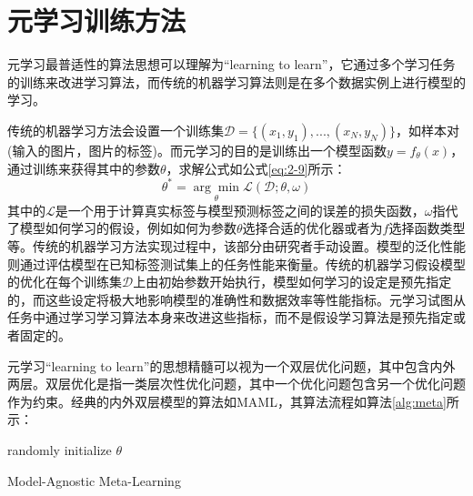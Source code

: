 \section{元学习训练方法}
元学习最普适性的算法思想可以理解为“learning to learn”，它通过多个学习任务的训练来改进学习算法，而传统的机器学习算法则是在多个数据实例上进行模型的学习。

传统的机器学习方法会设置一个训练集\(\mathcal{D} = \{(x_{1},y_{1}),...,(x_{N},y_{N})\}\)，如样本对(输入的图片，图片的标签)。而元学习的目的是训练出一个模型函数\(y = f_{\theta}(x)\)，通过训练来获得其中的参数\(\theta\)，求解公式如公式\ref{eq:2-9}所示：
\begin{equation}
  \theta^{*} = \underset { \theta } { \operatorname { arg } \operatorname { min } }\mathcal{L}(\mathcal{D};\theta,\omega) \label{eq:2-9}
\end{equation}
其中的\(\mathcal{L}\)是一个用于计算真实标签与模型预测标签之间的误差的损失函数，\(\omega\)指代了模型如何学习的假设，例如如何为参数\(\theta\)选择合适的优化器或者为\(f\)选择函数类型等。传统的机器学习方法实现过程中，该部分由研究者手动设置。模型的泛化性能则通过评估模型在已知标签测试集上的任务性能来衡量。传统的机器学习假设模型的优化在每个训练集\(\mathcal{D}\)上由初始参数开始执行，模型如何学习的设定是预先指定的，而这些设定将极大地影响模型的准确性和数据效率等性能指标。元学习试图从任务中通过学习学习算法本身来改进这些指标，而不是假设学习算法是预先指定或者固定的。

元学习“learning to learn”的思想精髓可以视为一个双层优化问题，其中包含内外两层。双层优化\cite{stackelberg1952theory}是指一类层次性优化问题，其中一个优化问题包含另一个优化问题作为约束\cite{franceschi2018bilevel}\cite{sinha2017review}。经典的内外双层模型的算法如MAML，其算法流程如算法\ref{alg:meta}所示：
\begin{algorithm}
    randomly initialize \(\theta\) \\
  \caption{Model-Agnostic Meta-Learning}\label{alg:meta}
  \end{algorithm}

